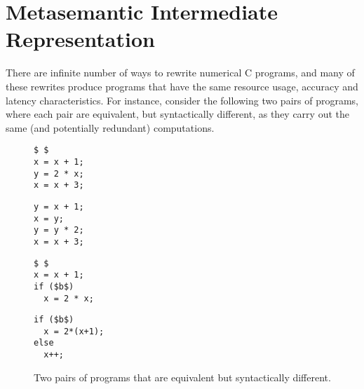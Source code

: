 \section{Metasemantic Intermediate Representation}
\label{po:sec:program_to_mir}

There are infinite number of ways to rewrite numerical C programs, and many of
these rewrites produce programs that have the same resource usage, accuracy and
latency characteristics.  For instance, consider the following two pairs of
programs, where each pair are equivalent, but syntactically different, as they
carry out the same (and potentially redundant) computations.
\begin{figure}[ht]
    \centering
    \newsavebox{\mirlsta}
    \begin{lrbox}{\mirlsta}
        \begin{lstlisting}
$ $
x = x + 1;
y = 2 * x;
x = x + 3;
        \end{lstlisting}
    \end{lrbox}
    \newsavebox{\mirlstb}
    \begin{lrbox}{\mirlstb}
        \begin{lstlisting}
y = x + 1;
x = y;
y = y * 2;
x = x + 3;
        \end{lstlisting}
    \end{lrbox}
    \newsavebox{\mirlstc}
    \begin{lrbox}{\mirlstc}
        \begin{lstlisting}
$ $
x = x + 1;
if ($b$)
  x = 2 * x;
        \end{lstlisting}
    \end{lrbox}
    \newsavebox{\mirlstd}
    \begin{lrbox}{\mirlstd}
        \begin{lstlisting}
if ($b$)
  x = 2*(x+1);
else
  x++;
        \end{lstlisting}
    \end{lrbox}
    \newcommand{\lstwidth}{0.25\textwidth}
    \subfloat[$P_1$]{%
        \begin{minipage}{\lstwidth}
            \usebox{\mirlsta}
        \end{minipage}
    }
    \subfloat[$P^\prime_1$]{%
        \begin{minipage}{\lstwidth}
            \usebox{\mirlstb}
        \end{minipage}
    }
    \subfloat[$P_2$]{%
        \begin{minipage}{\lstwidth}
            \usebox{\mirlstc}
        \end{minipage}
    }
    \subfloat[$P^\prime_2$]{%
        \begin{minipage}{\lstwidth}
            \usebox{\mirlstd}
        \end{minipage}
    }
    \caption{%
        Two pairs of programs that are equivalent but syntactically different.
    }\label{po:fig:equiv_progs}
\end{figure}

